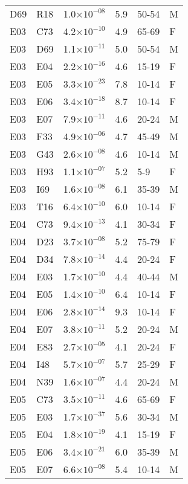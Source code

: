 \begin{longtable}{lllrll}
   D69 & R18 & 1.0$\times10^{-08}$ & 5.9 & 50-54 & M \\ 
   E03 & C73 & 4.2$\times10^{-10}$ & 4.9 & 65-69 & F \\ 
   E03 & D69 & 1.1$\times10^{-11}$ & 5.0 & 50-54 & M \\ 
   E03 & E04 & 2.2$\times10^{-16}$ & 4.6 & 15-19 & F \\ 
   E03 & E05 & 3.3$\times10^{-23}$ & 7.8 & 10-14 & F \\ 
   E03 & E06 & 3.4$\times10^{-18}$ & 8.7 & 10-14 & F \\ 
   E03 & E07 & 7.9$\times10^{-11}$ & 4.6 & 20-24 & M \\ 
   E03 & F33 & 4.9$\times10^{-06}$ & 4.7 & 45-49 & M \\ 
   E03 & G43 & 2.6$\times10^{-08}$ & 4.6 & 10-14 & M \\ 
   E03 & H93 & 1.1$\times10^{-07}$ & 5.2 & 5-9 & F \\ 
   E03 & I69 & 1.6$\times10^{-08}$ & 6.1 & 35-39 & M \\ 
   E03 & T16 & 6.4$\times10^{-10}$ & 6.0 & 10-14 & F \\ 
   E04 & C73 & 9.4$\times10^{-13}$ & 4.1 & 30-34 & F \\ 
   E04 & D23 & 3.7$\times10^{-08}$ & 5.2 & 75-79 & F \\ 
   E04 & D34 & 7.8$\times10^{-14}$ & 4.4 & 20-24 & F \\ 
   E04 & E03 & 1.7$\times10^{-10}$ & 4.4 & 40-44 & M \\ 
   E04 & E05 & 1.4$\times10^{-10}$ & 6.4 & 10-14 & F \\ 
   E04 & E06 & 2.8$\times10^{-14}$ & 9.3 & 10-14 & F \\ 
   E04 & E07 & 3.8$\times10^{-11}$ & 5.2 & 20-24 & M \\ 
   E04 & E83 & 2.7$\times10^{-05}$ & 4.1 & 20-24 & F \\ 
   E04 & I48 & 5.7$\times10^{-07}$ & 5.7 & 25-29 & F \\ 
   E04 & N39 & 1.6$\times10^{-07}$ & 4.4 & 20-24 & M \\ 
   E05 & C73 & 3.5$\times10^{-11}$ & 4.6 & 65-69 & F \\ 
   E05 & E03 & 1.7$\times10^{-37}$ & 5.6 & 30-34 & M \\ 
   E05 & E04 & 1.8$\times10^{-19}$ & 4.1 & 15-19 & F \\ 
   E05 & E06 & 3.4$\times10^{-21}$ & 6.0 & 35-39 & M \\ 
   E05 & E07 & 6.6$\times10^{-08}$ & 5.4 & 10-14 & M \\ 

\end{longtable}

